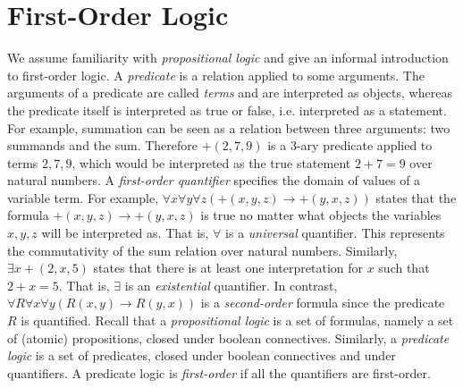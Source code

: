 \section{First-Order Logic}
We assume familiarity with \emph{propositional logic} and give an informal introduction to first-order logic.
%
A \emph{predicate} is a relation applied to some arguments.
%
The arguments of a predicate are called \emph{terms} and are interpreted as objects, whereas the predicate itself is interpreted as true or false, i.e. interpreted as a statement.
%
For example, summation can be seen as a relation between three arguments: two summands and the sum.
%
Therefore $+(2, 7, 9)$ is a $3$-ary predicate applied to terms $2, 7, 9$, which would be interpreted as the true statement $2+7=9$ over natural numbers.
%
A \emph{first-order quantifier} specifies the domain of values of a variable term.
%
For example, $\forall x \forall y \forall z (+(x, y, z) \rightarrow +(y, x, z))$ states that the formula $+(x, y, z) \rightarrow +(y, x, z)$ is true no matter what objects the variables $x, y, z$ will be interpreted as.
%
That is, $\forall$ is a \emph{universal} quantifier.
%
This represents the commutativity of the sum relation over natural numbers.
%
Similarly, $\exists x +(2,x,5)$ states that there is at least one interpretation for $x$ such that $2+x=5$.
%
That is, $\exists$ is an \emph{existential} quantifier.
%
In contrast, $\forall R \forall x \forall y ( R(x, y) \rightarrow R(y, x))$ is a \emph{second-order} formula since the predicate $R$ is quantified.
%
Recall that a \emph{propositional logic} is a set of formulas, namely a set of (atomic) propositions, closed under boolean connectives.
%
Similarly, a \emph{predicate logic} is a set of predicates, closed under boolean connectives and under quantifiers.
%
A predicate logic is \emph{first-order} if all the quantifiers are first-order.
